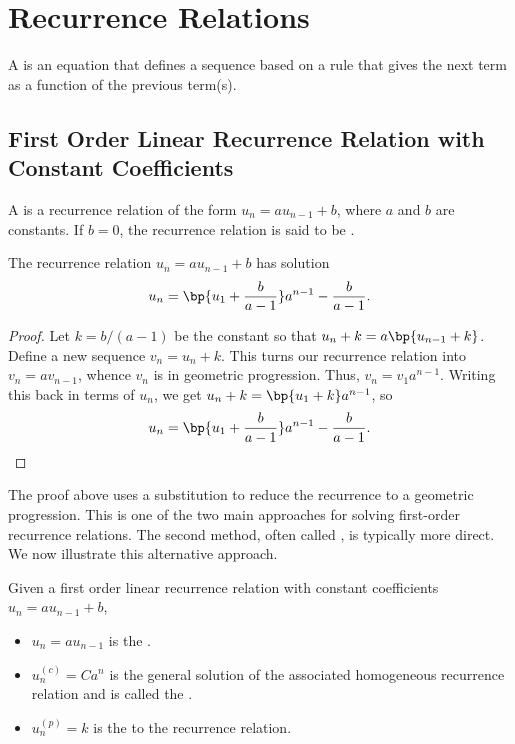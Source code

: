 \chapter{Recurrence Relations}

\begin{definition}
    A  is an equation that defines a sequence based on a rule that gives the next term as a function of the previous term(s).
\end{definition}

\section{First Order Linear Recurrence Relation with Constant Coefficients}

\begin{definition}
    A  is a recurrence relation of the form $u_n = a u_{n-1} + b$, where $a$ and $b$ are constants. If $b = 0$, the recurrence relation is said to be .
\end{definition}

\begin{proposition}
    The recurrence relation $u_n = a u_{n-1} + b$ has solution \[u_n = \bp{u_1 + \frac{b}{a-1}}a^{n-1} - \frac{b}{a-1}.\]
\end{proposition}
\begin{proof}
    Let $k = b/(a-1)$ be the constant so that $u_n + k = a\bp{u_{n-1} + k}$. Define a new sequence $v_n = u_n + k$. This turns our recurrence relation into $v_n = av_{n-1}$, whence $v_n$ is in geometric progression. Thus, $v_n = v_1 a^{n-1}$. Writing this back in terms of $u_n$, we get $u_n + k = \bp{u_1 + k} a^{n-1}$, so \[u_n = \bp{u_1 + \frac{b}{a-1}}a^{n-1} - \frac{b}{a-1}.\]
\end{proof}

The proof above uses a substitution to reduce the recurrence to a geometric progression. This is one of the two main approaches for solving first-order recurrence relations. The second method, often called , is typically more direct. We now illustrate this alternative approach.

\begin{definition}
    Given a first order linear recurrence relation with constant coefficients $u_n = au_{n-1} + b$,
    \begin{itemize}
        \item $u_n = au_{n-1}$ is the .
        \item $u_n^{(c)} = Ca^n$ is the general solution of the associated homogeneous recurrence relation and is called the .
        \item $u_n^{(p)} = k$ is the  to the recurrence relation.
    \end{itemize}
\end{definition}

